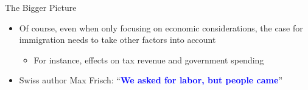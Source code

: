 \documentclass[10pt,hyperref={CJKbookmarks=true},xcolor=dvipsnames,aspectratio=169]{beamer}
\begin{document}
\begin{frame}{The Bigger Picture}

\begin{itemize}
\item Of course, even when only focusing on economic considerations, the
case for immigration needs to take other factors into account 

\begin{itemize}
\item For instance, effects on tax revenue and government spending 
\end{itemize}
\item Swiss author Max Frisch: “\textbf{\textcolor{blue}{We asked for labor,
but people came}}” 
\end{itemize}
\end{frame}
\end{document}
